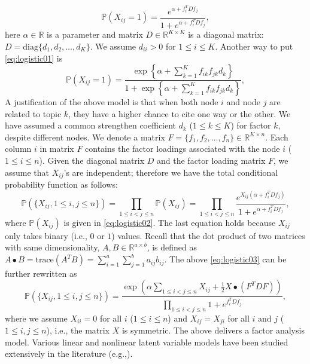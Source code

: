 \documentclass{article}
\begin{document}
\begin{equation} 
\label{eq:logistic01}
\mathbb{P}(X_{ij}=1) = \frac{e^{\alpha + f_i^T D f_j }}{1 + e^{\alpha + f_i^T D f_j }},
\end{equation}
here $\alpha \in \mathbb{R}$ is a parameter and matrix $D \in \mathbb{R}^{K \times K}$ is a diagonal matrix: $D = \mbox{diag}\{d_{1},d_{2},\ldots,d_{K}\}$. We assume $d_{ii} > 0$ for $1 \le i \le K$.
Another way to put \eqref{eq:logistic01} is
\begin{equation}
\label{eq:logistic02}
\mathbb{P}(X_{ij}=1) = \frac{\exp\left\{\alpha + \sum_{k=1}^K f_{ik}f_{jk}d_{k} \right\}}{1 + \exp\left\{\alpha + \sum_{k=1}^K f_{ik}f_{jk}d_{k} \right\}},
\end{equation}
A justification of the above model is that when both node $i$ and node $j$ are related to topic $k$, they have a higher chance to cite one way or the other. We have assumed a common strengthen coefficient $d_k$ ($1\le k \le K$) for factor $k$, despite different nodes. We denote a matrix $F = \{f_1, f_2, \ldots, f_n\} \in \mathbb{R}^{K \times n}$. Each column $i$ in matrix $F$ contains the factor loadings associated with the node $i$ ($1\le i \le n$). Given the diagonal matrix $D$ and the factor loading matrix $F$, we assume that $X_{ij}$'s are independent; therefore we have the total conditional probability function as follows: 
\begin{equation}
\label{eq:logistic03}
\mathbb{P}(\{X_{ij}, 1\le i,j \le n\})
= \prod_{1\le i<j \le n} \mathbb{P}(X_{ij})
= \prod_{1\le i<j \le n}  \frac{e^{X_{ij}(\alpha + f_i^T D f_j) }}{1 + e^{\alpha + f_i^T D f_j }},
\end{equation}
where $\mathbb{P}(X_{ij})$ is given in \eqref{eq:logistic02}.
The last equation holds because $X_{ij}$ only takes binary (i.e., $0$ or $1$) values.
Recall that the dot product of two matrices with same dimensionality, $A,B\in \mathbb{R}^{a \times b}$, is defined as $A\bullet B=\mbox{trace}(A^T B) = \sum_{i=1}^a\sum_{j=1}^b a_{ij}b_{ij}$.
The above \eqref{eq:logistic03} can be further rewritten as
\begin{equation}
\label{eq:logistic04}
\mathbb{P}(\{X_{ij}, 1\le i,j \le n\})
= \frac{\exp(\alpha \sum_{1\le i< j\le n}X_{ij} +\frac{1}{2} X \bullet (F^T D F))}{\prod_{1\le i<j \le n}  1 + e^{f_i^T D f_j }},
\end{equation}
where we assume $X_{ii}=0$ for all $i$ ($1\le i \le n$) and $X_{ij} = X_{ji}$ for all $i$ and $j$ ($1\le i,j \le n$), i.e., the matrix $X$ is symmetric.
The above delivers a factor analysis model. Various linear and nonlinear latent variable models have been studied extensively in the literature (e.g.,\cite{joreskog1969general, mcdonald2014factor,lord2008statistical, rasch1980probabilistic, harman1960modern, joreskog1970general}).
\end{document}
